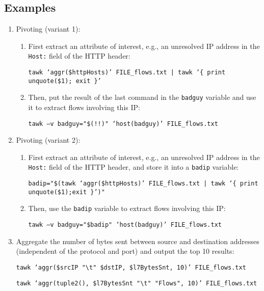 \documentclass[documentation]{subfiles}
\begin{document}
\subsection{Examples}
\begin{enumerate}
    \item Pivoting (variant 1):
        \begin{enumerate}
            \item First extract an attribute of interest, e.g., an unresolved IP address in the {\tt Host:} field of the HTTP header:
                \begin{center}{\tt tawk `aggr(\$httpHosts)' FILE\_flows.txt | tawk `\{ print unquote(\$1); exit \}'}\end{center}
                \item Then, put the result of the last command in the {\tt badguy} variable and use it to extract flows involving this IP:
                \begin{center}{\tt tawk --v badguy="\$(!!)" `host(badguy)' FILE\_flows.txt}\end{center}
        \end{enumerate}
    \item Pivoting (variant 2):
        \begin{enumerate}
            \item First extract an attribute of interest, e.g., an unresolved IP address in the {\tt Host:} field of the HTTP header, and store it into a {\tt badip} variable:
                \begin{center}{\tt badip="\$(tawk `aggr(\$httpHosts)' FILE\_flows.txt | tawk `\{ print unquote(\$1);exit \}')"}\end{center}
            \item Then, use the {\tt badip} variable to extract flows involving this IP:
                \begin{center}{\tt tawk --v badguy="\$badip" `host(badguy)' FILE\_flows.txt}\end{center}
        \end{enumerate}
    \item Aggregate the number of bytes sent between source and destination addresses (independent of the protocol and port) and output the top 10 results:
        \begin{center}{\tt tawk `aggr(\$srcIP "\textbackslash{}t" \$dstIP, \$l7BytesSnt, 10)' FILE\_flows.txt}\end{center}
            \begin{center}{\tt tawk `aggr(tuple2(), \$l7BytesSnt "\textbackslash{}t" "Flows", 10)' FILE\_flows.txt}\end{center}

\end{enumerate}
\end{document}
